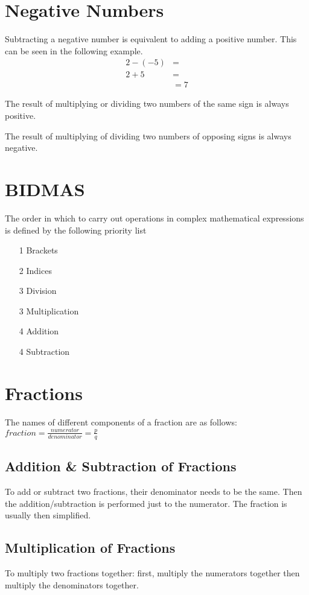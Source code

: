 
\section*{Negative Numbers}
Subtracting a negative number is equivalent to adding a positive number. This can be seen in the following example.
\begin{align*}
    2-(-5)&=\\
    2+5&=\\
    &=7
\end{align*}

The result of multiplying or dividing two numbers of the same sign is always positive.

The result of multiplying of dividing two numbers of opposing signs is always negative.

\section*{BIDMAS}
The order in which to carry out operations in complex mathematical expressions is defined by the following priority list
\begin{itemize}
    \item[1] Brackets
    \item[2] Indices
    \item[3] Division
    \item[3] Multiplication
    \item[4] Addition
    \item[4] Subtraction 
\end{itemize}

\section*{Fractions}
The names of different components of a fraction are as follows:
$ \displaystyle fraction = \frac{numerator}{denominator} = \frac{p}{q}$
\subsection*{Addition \& Subtraction of Fractions}
To add or subtract two fractions, their denominator needs to be the same. Then the addition/subtraction is performed just to the numerator. The fraction is usually then simplified.
\subsection*{Multiplication of Fractions}
To multiply two fractions together: first, multiply the numerators together then multiply the denominators together.
